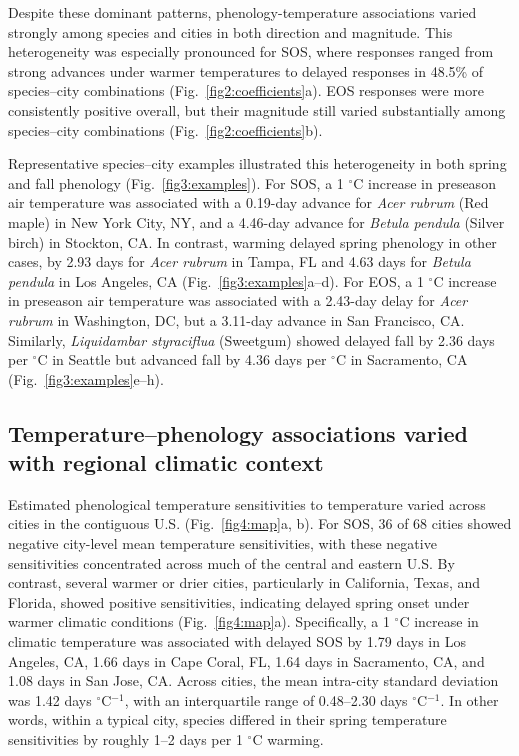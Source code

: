 

Despite these dominant patterns, phenology-temperature associations varied strongly among species and cities in both direction and magnitude. This heterogeneity was especially pronounced for SOS, where responses ranged from strong advances under warmer temperatures to delayed responses in 48.5\% of species--city combinations (Fig.~\ref{fig2:coefficients}a). EOS responses were more consistently positive overall, but their magnitude still varied substantially among species--city combinations (Fig.~\ref{fig2:coefficients}b).

Representative species--city examples illustrated this heterogeneity in both spring and fall phenology (Fig.~\ref{fig3:examples}). For SOS, a 1 $^\circ$C increase in preseason air temperature was associated with a 0.19-day advance for \textit{Acer rubrum} (Red maple) in New York City, NY, and a 4.46-day advance for \textit{Betula pendula} (Silver birch) in Stockton, CA. In contrast, warming delayed spring phenology in other cases, by 2.93 days for \textit{Acer rubrum} in Tampa, FL and 4.63 days for \textit{Betula pendula} in Los Angeles, CA (Fig.~\ref{fig3:examples}a--d). For EOS, a 1 $^\circ$C increase in preseason air temperature was associated with a 2.43-day delay for \textit{Acer rubrum} in Washington, DC, but a 3.11-day advance in San Francisco, CA. Similarly, \textit{Liquidambar styraciflua} (Sweetgum) showed delayed fall by 2.36 days per $^\circ$C in Seattle but advanced fall by 4.36 days per $^\circ$C in Sacramento, CA (Fig.~\ref{fig3:examples}e--h).



\subsection{Temperature--phenology associations varied with regional climatic context}

Estimated phenological temperature sensitivities to temperature varied across cities in the contiguous U.S. (Fig.~\ref{fig4:map}a, b). For SOS, 36 of 68 cities showed negative city-level mean temperature sensitivities, with these negative sensitivities concentrated across much of the central and eastern U.S. By contrast, several warmer or drier cities, particularly in California, Texas, and Florida, showed positive sensitivities, indicating delayed spring onset under warmer climatic conditions (Fig.~\ref{fig4:map}a). Specifically, a 1 $^\circ$C increase in climatic temperature was associated with delayed SOS by 1.79 days in Los Angeles, CA, 1.66 days in Cape Coral, FL, 1.64 days in Sacramento, CA, and 1.08 days in San Jose, CA. Across cities, the mean intra-city standard deviation was 1.42 days $^\circ$C$^{-1}$, with an interquartile range of 0.48--2.30 days $^\circ$C$^{-1}$. In other words, within a typical city, species differed in their spring temperature sensitivities by roughly 1--2 days per 1 $^\circ$C warming.

